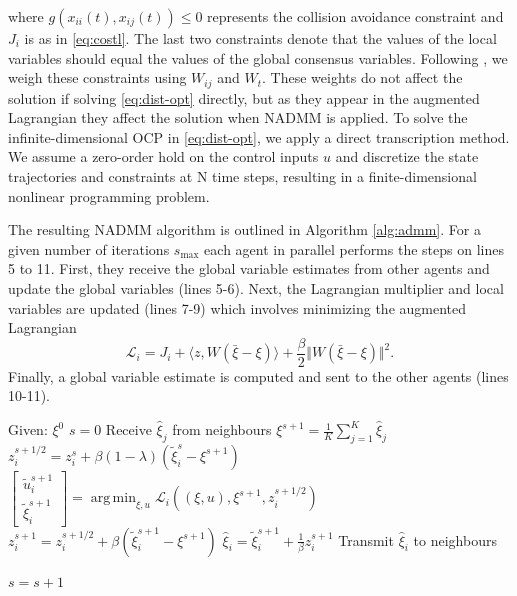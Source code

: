 \documentclass[letterpaper, 10 pt, conference]{ieeeconf}  %
\DeclareMathOperator*{\argmin}{arg\,min}
\begin{document}
\noindent where $ g(x_{ii}(t), x_{ij}(t)) \leq 0$ represents the collision avoidance constraint and $J_i$ is as in \eqref{eq:costl}. The last two constraints denote that the values of the local variables should equal the values of the global consensus variables. Following \cite{tran2024parallel}, we weigh these constraints using $W_{ij}$ and $W_t$. These weights do not affect the solution if solving \eqref{eq:dist-opt} directly, but as they appear in the augmented Lagrangian they affect the solution when NADMM is applied. To solve the infinite-dimensional OCP in \eqref{eq:dist-opt}, we apply a direct transcription method. We assume a zero-order hold on the control inputs $u$ and discretize the state trajectories and constraints at N time steps, resulting in a finite-dimensional nonlinear programming problem.

The resulting NADMM algorithm is outlined in Algorithm \ref{alg:admm}. For a given number of iterations $s_{\text{max}}$ each agent in parallel performs the steps on lines 5 to 11. First, they receive the global variable estimates from other agents and update the global variables (lines 5-6). Next, the Lagrangian multiplier and local variables are updated (lines 7-9) which involves minimizing the augmented Lagrangian
\begin{equation}
\mathcal{L}_i = J_i + \langle z, W(\bar{\xi}-\xi) \rangle + \frac{\beta}{2} \Vert W(\bar{\xi}-\xi)\Vert^2.
\end{equation}
\noindent Finally, a global variable estimate is computed and sent to the other agents (lines 10-11).

\begin{algorithm}[tb]
\caption{Nonlinear ADMM for simultaneous MAMP}
\label{alg:admm}
\begin{algorithmic}[1]
\State Given: $\xi^0$
\State $s = 0$
		\State Receive $\hat{\xi}_j$ from neighbours
		\State $\xi^{s+1} = \frac{1}{K} \sum_{j=1}^K \hat{\xi}_j$
		\State $z_i^{s+1/2} = z_i^s + \beta(1-\lambda)(\tilde{\xi}_i^{s} - \xi^{s+1})$
		\State $\begin{bmatrix} \tilde{u}_i^{s+1} \\ \tilde{\xi}_i^{s+1} \end{bmatrix} = \argmin_{\xi, u} \mathcal{L}_i((\xi, u), \xi^{s+1}, z_i^{s+1/2})$
		\State $z_i^{s+1} = z_i^{s+1/2} + \beta (\tilde{\xi}_i^{s+1} - \xi^{s+1})$
		\State $\hat{\xi}_i = \tilde{\xi}_i^{s+1} + \frac{1}{\beta} z_i^{s+1}$
		\State Transmit $\hat{\xi}_i$ to neighbours
		
	\EndFor
	\State $s = s + 1$
\EndWhile
\end{algorithmic}
\end{algorithm}
\end{document}
